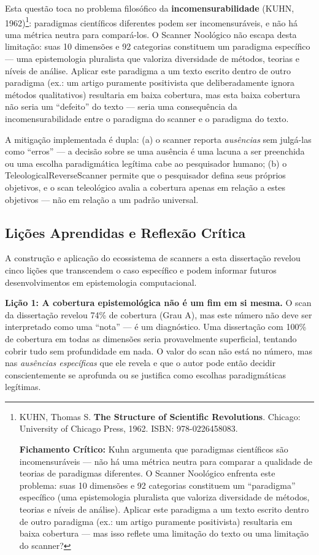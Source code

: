 Esta questão toca no problema filosófico da \textbf{incomensurabilidade} (KUHN, 1962)\footnote{
  KUHN, Thomas S. \textbf{The Structure of Scientific Revolutions}. Chicago: University of Chicago Press, 1962. ISBN: 978-0226458083.

  \textbf{Fichamento Crítico:} Kuhn argumenta que paradigmas científicos são incomensuráveis --- não há uma métrica neutra para comparar a qualidade de teorias de paradigmas diferentes. O Scanner Noológico enfrenta este problema: suas 10 dimensões e 92 categorias constituem um ``paradigma'' específico (uma epistemologia pluralista que valoriza diversidade de métodos, teorias e níveis de análise). Aplicar este paradigma a um texto escrito dentro de outro paradigma (ex.: um artigo puramente positivista) resultaria em baixa cobertura --- mas isso reflete uma limitação do texto ou uma limitação do scanner?
}: paradigmas científicos diferentes podem ser incomensuráveis, e não há uma métrica neutra para compará-los. O Scanner Noológico não escapa desta limitação: suas 10 dimensões e 92 categorias constituem um paradigma específico --- uma epistemologia pluralista que valoriza diversidade de métodos, teorias e níveis de análise. Aplicar este paradigma a um texto escrito dentro de outro paradigma (ex.: um artigo puramente positivista que deliberadamente ignora métodos qualitativos) resultaria em baixa cobertura, mas esta baixa cobertura não seria um ``defeito'' do texto --- seria uma consequência da incomensurabilidade entre o paradigma do scanner e o paradigma do texto.

A mitigação implementada é dupla: (a) o scanner reporta \textit{ausências} sem julgá-las como ``erros'' --- a decisão sobre se uma ausência é uma lacuna a ser preenchida ou uma escolha paradigmática legítima cabe ao pesquisador humano; (b) o TeleologicalReverseScanner permite que o pesquisador defina seus próprios objetivos, e o scan teleológico avalia a cobertura apenas em relação a estes objetivos --- não em relação a um padrão universal.

\subsection{Lições Aprendidas e Reflexão Crítica}

A construção e aplicação do ecossistema de scanners a esta dissertação revelou cinco lições que transcendem o caso específico e podem informar futuros desenvolvimentos em epistemologia computacional.

\textbf{Lição 1: A cobertura epistemológica não é um fim em si mesma.} O scan da dissertação revelou 74\% de cobertura (Grau A), mas este número não deve ser interpretado como uma ``nota'' --- é um diagnóstico. Uma dissertação com 100\% de cobertura em todas as dimensões seria provavelmente superficial, tentando cobrir tudo sem profundidade em nada. O valor do scan não está no número, mas nas \textit{ausências específicas} que ele revela e que o autor pode então decidir conscientemente se aprofunda ou se justifica como escolhas paradigmáticas legítimas.

